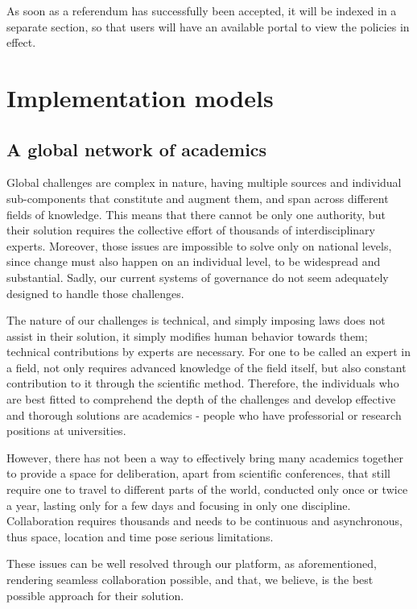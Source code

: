 \documentclass[a4paper,11pt]{article}
\begin{document}
\begin{multicols}{2}
As soon as a referendum has successfully been accepted, it will be indexed in a separate section, so that users will have an available portal to view the policies in effect.

\section{Implementation models} \label{implementation}

\subsection{A global network of academics} \label{academics}

Global challenges are complex in nature, having multiple sources and individual sub-components that constitute and augment them, and span across different fields of knowledge. This means that there cannot be only one authority, but their solution requires the collective effort of thousands of interdisciplinary experts. Moreover, those issues are impossible to solve only on national levels, since change must also happen on an individual level, to be widespread and substantial. Sadly, our current systems of governance do not seem adequately designed to handle those challenges.

The nature of our challenges is technical, and simply imposing laws does not assist in their solution, it simply modifies human behavior towards them; technical contributions by experts are necessary. For one to be called an expert in a field, not only requires advanced knowledge of the field itself, but also constant contribution to it through the scientific method. Therefore, the individuals who are best fitted to comprehend the depth of the challenges and develop effective and thorough solutions are academics - people who have professorial or research positions at universities.

However, there has not been a way to effectively bring many academics together to provide a space for deliberation, apart from scientific conferences, that still require one to travel to different parts of the world, conducted only once or twice a year, lasting only for a few days and focusing in only one discipline. Collaboration requires thousands and needs to be continuous and asynchronous, thus space, location and time pose serious limitations.

These issues can be well resolved through our platform, as aforementioned, rendering seamless collaboration possible, and that, we believe, is the best possible approach for their solution.


\end{multicols}
\end{document}
